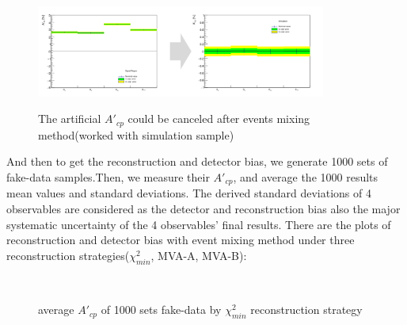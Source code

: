 		\begin{figure}[H]
		\centering{}
	    	\includegraphics[width=0.85\textwidth]{Figures/Asym/artificial/a05_artificial_to_mix_fixed.pdf}\\
		\caption{The artificial $A'_{cp}$ could be canceled after events mixing method(worked with simulation sample)}
		\label{AsymBias:fig:washout_artificial}
		\end{figure}
		\FloatBarrier

		And then to get the reconstruction and detector bias, we generate 1000 sets of fake-data samples.Then, we measure their $A'_{cp}$, and average the 1000 results mean values and standard deviations. The derived standard deviations of 4 observables are considered as the detector and reconstruction bias also the major systematic uncertainty of the 4 observables' final results. There are the plots of reconstruction and detector bias with event mixing method under three reconstruction strategies($\chi^2_{min}$, MVA-A, MVA-B):

		\begin{figure}[H]
			\centering
				\\
		\caption{average $A'_{cp}$ of 1000 sets fake-data by $\chi^2_{min}$ reconstruction strategy}
		\label{AsymBias:fig:chi2_DetBias}
		\end{figure}
		\FloatBarrier

